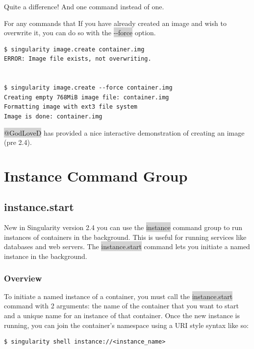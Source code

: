 \documentclass[a4paper]{article}
\newcounter{subsubsubsection}[subsubsection]
\begin{document}
Quite a difference! And one command instead of one.

		
For any commands that If you have already created an image and wish to overwrite it, you can do so with the \colorbox{lightgray}{-{}-force} option.
		
\begin{lstlisting}[frame=single]
$ singularity image.create container.img
ERROR: Image file exists, not overwriting.


$ singularity image.create --force container.img
Creating empty 768MiB image file: container.img
Formatting image with ext3 file system
Image is done: container.img
\end{lstlisting}

\colorbox{lightgray}{@GodLoveD} has provided a nice interactive demonstration of creating an image (pre 2.4).
 

\section{Instance Command Group}
\label{sec:instances}
\subsection{instance.start}
\label{sec:instancestart}

New in Singularity version 2.4 you can use the \colorbox{lightgray}{instance} command group to run instances of containers in the background. This is useful for running services like databases and web servers. The \colorbox{lightgray}{instance.start} command lets you initiate a named instance in the background.


\subsubsection{Overview}

To initiate a named instance of a container, you must call the \colorbox{lightgray}{instance.start} command with 2 arguments: the name of the container that you want to start and a unique name for an instance of that container. Once the new instance is running, you can join the container’s namespace using a URI style syntax like so:

\begin{lstlisting}[frame=single]
$ singularity shell instance://<instance_name>
\end{lstlisting}
\end{document}

